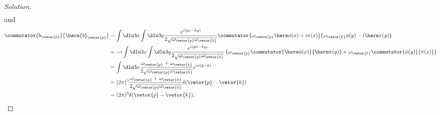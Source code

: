 \begin{proof}[Solution]
\begin{align*}
   \end{align*}
   and
   \begin{align*}
      \commutator{b_{\vetor{p}}}{\herm{b}_{\vetor{p}}} &= \int \dln3x \int \dln3y \frac{e^{i(px - ky)}}{2\sqrt{\omega_{\vetor{p}} \omega_{\vetor{k}}}} \commutator{\omega_{\vetor{p}}\herm\phi(x) + i \pi(x)}{\omega_{\vetor{k}} {\phi}(y) - i \herm\pi(y)}\\
                                                       &= -i\int \dln3x \int \dln3y \frac{e^{i(px - ky)}}{2\sqrt{\omega_{\vetor{p}} \omega_{\vetor{k}}}} \left(\omega_{\vetor{p}}\commutator{\herm\phi(x)}{\herm\pi(y)} + \omega_{\vetor{k}} \commutator{\phi(y)}{\pi(x)}\right)\\
                                                       &= \int \dln3x \frac{\omega_{\vetor{p}} + \omega_{\vetor{k}}}{2 \sqrt{\omega_{\vetor{p}} \omega_{\vetor{k}}}} e^{i x (p - k)}\\
                                                       &= (2\pi)^3 \frac{\omega_{\vetor{p}} + \omega_{\vetor{k}}}{2\sqrt{\omega_{\vetor{p}} \omega_{\vetor{k}}}} \delta(\vetor{p} - \vetor{k})\\
                                                       &= (2\pi)^3 \delta(\vetor{p} - \vetor{k}).
   \end{align*}


\end{proof}
